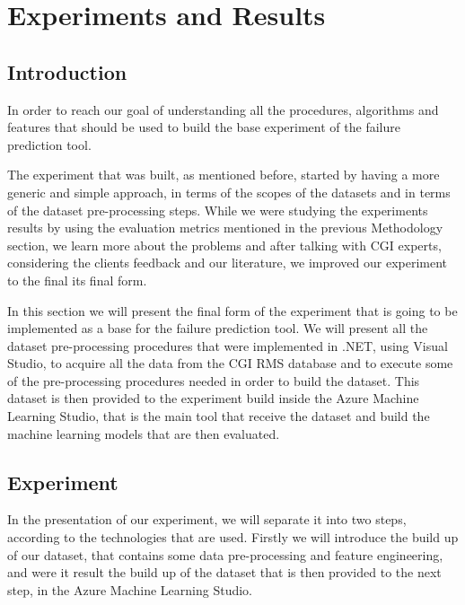 

\chapter{Experiments and Results}
\label{cha:Experiments and Results}


\section{Introduction}
\label{sub:if_you_use_this_template} 
In order to reach our goal of understanding all the procedures, algorithms and features that should be used to build the base experiment of the failure prediction tool.

The experiment that was built, as mentioned before, started by having a more generic and simple approach, in terms of the scopes of the datasets and in terms of the dataset pre-processing steps. While we were studying the experiments results by using the evaluation metrics mentioned in the previous Methodology section, we learn more about the problems and after talking with CGI experts, considering the clients feedback and our literature, we improved our experiment to the final its final form.

In this section we will present the final form of the experiment that is going to be implemented as a base for the failure prediction tool. We will present all the dataset pre-processing procedures that were implemented in .NET, using Visual Studio, to acquire all the data from the CGI RMS database and to execute some of the pre-processing procedures needed in order to build the dataset. This dataset is then provided to the experiment build inside the Azure Machine Learning Studio, that is the main tool that receive the dataset and build the machine learning models that are then evaluated.

\section{Experiment}
In the presentation of our experiment, we will separate it into two steps, according to the technologies that are used. Firstly we will introduce the build up of our dataset, that contains some data pre-processing and feature engineering, and were it result the build up of the dataset that is then provided to the next step, in the Azure Machine Learning Studio.

